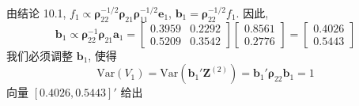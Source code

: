 由结论 10.1, $f_1\propto\boldsymbol{\rho}_{22}^{-1/2}\boldsymbol{\rho}_{21}\boldsymbol{\rho}_{11}^{-1/2}\mathbf{e}_1$, $\mathbf{b}_1=\boldsymbol{\rho}_{22}^{-1/2}f_1$. 因此,
\[
\mathbf{b}_1\propto\boldsymbol{\rho}_{22}^{-1}\boldsymbol{\rho}_{21}\mathbf{a}_1=\begin{bmatrix}0.3959 & 0.2292\\ 0.5209 & 0.3542\end{bmatrix}\begin{bmatrix}0.8561\\0.2776\end{bmatrix}=\begin{bmatrix}0.4026\\0.5443\end{bmatrix}
\]
我们必须调整 $\mathbf{b}_1$, 使得
\[
\mathrm{Var}(V_1)=\mathrm{Var}(\mathbf{b}_1'\mathbf{Z}^{(2)})=\mathbf{b}_1'\boldsymbol{\rho}_{22}\mathbf{b}_1=1
\]
向量 $[0.4026,0.5443]'$ 给出

